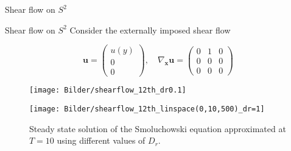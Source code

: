 \begin{comment}
	\begin{block}{Proposition 3}
		Sprectal method for $N=3$ is stable with for both small and large $D_r$.
	\end{block}
\end{frame}
	Inhalt...
\end{comment}



\begin{frame}
	\centering
	Shear flow on $S^2$
\end{frame}

\begin{frame}{Shear flow on $S^2$}
	\scriptsize
	Consider the externally imposed shear flow 
	\begin{figure}
		\centering
		\begin{equation}
			\mathbf{u}=\begin{pmatrix}
				u(y) \\
				0 \\
				0
			\end{pmatrix}, \quad \nabla_{\mathbf{x}} \mathbf{u}=\begin{pmatrix}
				0 & 1 & 0 \\
				0 & 0 & 0 \\
				0 & 0 & 0
			\end{pmatrix}
		\end{equation}
	\end{figure}

\begin{figure}
	\small
	\begin{minipage}{0.43\textwidth}
		\texttt{[image: Bilder/shearflow\_12th\_dr0.1]}
	\end{minipage}
	\hfill 
	\begin{minipage}{0.43\textwidth}
		\texttt{[image: Bilder/shearflow\_12th\_linspace(0,10,500)\_dr=1]}
	\end{minipage}
	\caption{Steady state solution of the Smoluchowski equation approximated at $T = 10$ using different values of $D_r$.}
\end{figure}
\end{frame}

